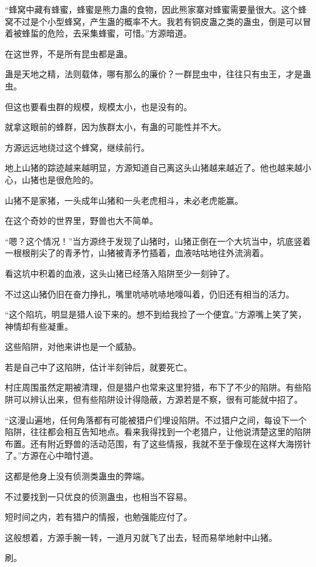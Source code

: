 \begin{this_body}
“蜂窝中藏有蜂蜜，蜂蜜是熊力蛊的食物，因此熊家寨对蜂蜜需要量很大。这个蜂窝不过是个小型蜂窝，产生蛊的概率不大。我若有铜皮蛊之类的蛊虫，倒是可以冒着被蜂蜇的危险，去采集蜂蜜，可惜。”方源暗道。

在这世界，不是所有昆虫都是蛊。

蛊是天地之精，法则载体，哪有那么的廉价？一群昆虫中，往往只有虫王，才是蛊虫。

但这也要看虫群的规模，规模太小，也是没有的。

就拿这眼前的蜂群，因为族群太小，有蛊的可能性并不大。

方源远远地绕过这个蜂窝，继续前行。

地上山猪的踪迹越来越明显，方源知道自己离这头山猪越来越近了。他也越来越小心，山猪也是很危险的。

山猪不是家猪，一头成年山猪和一头老虎相斗，未必老虎能赢。

在这个奇妙的世界里，野兽也大不简单。

“嗯？这个情况！”当方源终于发现了山猪时，山猪正倒在一个大坑当中，坑底竖着一根根削尖了的青矛竹，山猪被青矛竹插着，血液咕咕地往外流淌着。

看这坑中积着的血液，这头山猪已经落入陷阱至少一刻钟了。

不过这山猪仍旧在奋力挣扎，嘴里吭哧吭哧地嚎叫着，仍旧还有相当的活力。

“这个陷坑，明显是猎人设下来的。想不到给我捡了一个便宜。”方源嘴上笑了笑，神情却有些凝重。

这些陷阱，对他来讲也是一个威胁。

若是自己中了这陷阱，估计半刻钟后，就要死亡。

村庄周围虽然定期被清理，但是猎户也常来这里狩猎，布下了不少的陷阱。有些陷阱可以辨认出来，但有些陷阱设计得隐蔽，方源若是不察，很有可能就中招了。

“这漫山遍地，任何角落都有可能被猎户们埋设陷阱。不过猎户之间，每设下一个陷阱，往往都会相互告知地点。看来我得找到一个老猎户，让他说清楚这里的陷阱布置。还有附近野兽的活动范围，有了这些情报，我就不至于像现在这样大海捞针了。”方源在心中暗忖道。

这都是他身上没有侦测类蛊虫的弊端。

不过要找到一只优良的侦测蛊虫，也相当不容易。

短时间之内，若有猎户的情报，也勉强能应付了。

这般想着，方源手腕一转，一道月刃就飞了出去，轻而易举地射中山猪。

刷。


\end{this_body}
